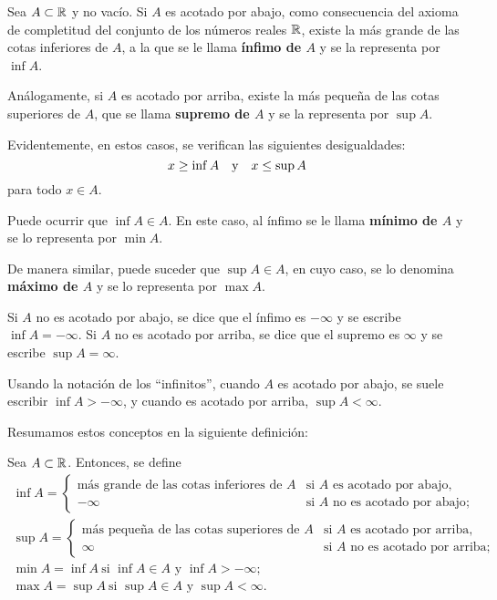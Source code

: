 Sea $A\subset\mathbb{R}$ y no vacío. Si $A$ es acotado por abajo, como consecuencia del axioma de
completitud del conjunto de los números reales $\mathbb{R}$, existe la más grande de las cotas inferiores
de $A$, a la que se le llama \textbf{ínfimo de $A$} y se la representa por $\inf A$.

Análogamente, si $A$ es acotado por arriba, existe la más pequeña de las cotas superiores de $A$,
que se llama \textbf{supremo de $A$} y se la representa por $\sup A$.

Evidentemente, en estos casos, se verifican las siguientes desigualdades:
\[
x \geq \inf A \quad\text{y}\quad x \leq \sup A
\]
para todo $x\in A$.

Puede ocurrir que $\inf A \in A$. En este caso, al ínfimo se le llama \textbf{mínimo de $A$} y se
lo representa por $\min A$.

De manera similar, puede suceder que $\sup A\in A$, en cuyo caso, se lo denomina \textbf{máximo de
$A$} y se lo representa por $\max A$.

Si $A$ no es acotado por abajo, se dice que el ínfimo es $-\infty$ y se escribe $\inf A = -\infty$.
Si $A$ no es acotado por arriba, se dice que el supremo es $\infty$ y se escribe $\sup A = \infty$.

Usando la notación de los ``infinitos'', cuando $A$ es acotado por abajo, se suele escribir $\inf A
> -\infty$, y cuando es acotado por arriba, $\sup A < \infty$.

Resumamos estos conceptos en la siguiente definición:

\begin{defical}
Sea $A \subset \mathbb{R}$. Entonces, se define
\[
\begin{array}{l}
\inf A =
\begin{cases}
\text{más grande de las cotas inferiores de $A$} & \text{si $A$ es acotado por abajo,} \\
-\infty & \text{si $A$ no es acotado por abajo};
\end{cases}
\\[16pt]
\sup A =
\begin{cases}
\text{más pequeña de las cotas superiores de $A$} & \text{si $A$ es acotado por arriba,} \\
\infty & \text{si $A$ no es acotado por arriba};
\end{cases}
\\[16pt]
\min A = \inf A \ \text{si $\inf A \in A$ y $\inf A > -\infty$}; \\[4pt]
\max A = \sup A \ \text{si $\sup A \in A$ y $\sup A < \infty$}.
\end{array}
\]
\end{defical}

